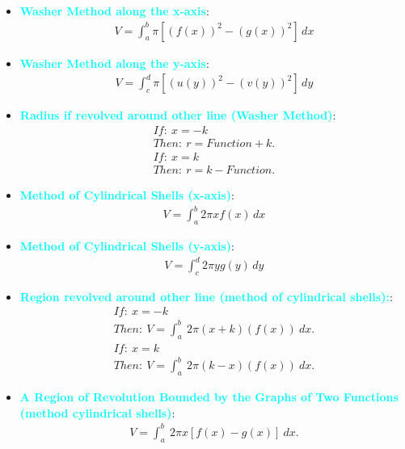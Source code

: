 \documentclass{report}
\begin{document}
\begin{itemize}
        \item \textbf{\textcolor{cyan}{Washer Method along the x-axis}}:
            \begin{align}
                V = \int_{a}^{b} \pi [(f(x))^2 - (g(x))^2] \, dx
            \end{align}

        \item \textbf{\textcolor{cyan}{Washer Method along the y-axis}}:
            \begin{align}
                V = \int_{c}^{d} \pi [(u(y))^2 - (v(y))^2] \, dy
            \end{align}

        \item \textbf{\textcolor{cyan}{Radius if revolved around other line (Washer Method)}}:
            \begin{align*}
                If:\ x=-k\\
                Then:\ r = Function + k
            .\end{align*}
            \begin{align*}
                If:\ x=k\\
                Then:\ r = k - Function
            .\end{align*}

        \item \textbf{\textcolor{cyan}{Method of Cylindrical Shells (x-axis)}}:
            \begin{align}
                V = \int_{a}^{b} 2\pi x f(x) \, dx
            \end{align}

        \item \textbf{\textcolor{cyan}{Method of Cylindrical Shells (y-axis)}}:
            \begin{align}
                V = \int_{c}^{d} 2\pi y g(y) \, dy
            \end{align}

        \item \textbf{\textcolor{cyan}{Region revolved around other line (method of cylindrical shells):}}:
            \begin{align*}
                If:\ x=-k \\
                Then:\ V = \int_{a}^{b}\ 2\pi (x+k)(f(x))\ dx
            .\end{align*}
            \begin{align*}
                If:\ x=k \\
                Then:\ V = \int_{a}^{b}\ 2\pi (k-x)(f(x))\ dx
            .\end{align*}
        \item \textbf{\textcolor{cyan}{A Region of Revolution Bounded by the Graphs of Two Functions (method cylindrical shells)}}:
            \begin{align*}
                V = \int_{a}^{b}\ 2\pi x\left[f(x)-g(x)\right]\ dx
            .\end{align*}


\end{itemize}
\end{document}
